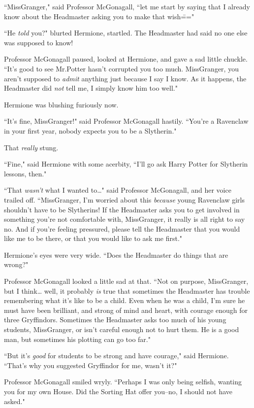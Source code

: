 ``Miss\?Granger," said Professor McGonagall, ``let me start by saying that I already know about the Headmaster asking you to make that wish\==="

``He \emph{told} you?" blurted Hermione, startled. The Headmaster had said no one else was supposed to know!

Professor McGonagall paused, looked at Hermione, and gave a sad little chuckle. ``It's good to see Mr.\?Potter hasn't corrupted you too much. Miss\?Granger, you aren't supposed to \emph{admit} anything just because I say I know. As it happens, the Headmaster did \emph{not} tell me, I simply know him too well."

Hermione was blushing furiously now.

``It's fine, Miss\?Granger!" said Professor McGonagall hastily. ``You're a Ravenclaw in your first year, nobody expects you to be a Slytherin."

That \emph{really} stung.

``Fine," said Hermione with some acerbity, ``I'll go ask Harry Potter for Slytherin lessons, then."

``That \emph{wasn't} what I wanted to{\ldots}" said Professor McGonagall, and her voice trailed off. ``Miss\?Granger, I'm worried about this \emph{because} young Ravenclaw girls shouldn't have to be Slytherins! If the Headmaster asks you to get involved in something you're not comfortable with, Miss\?Granger, it really is all right to say no. And if you're feeling pressured, please tell the Headmaster that you would like me to be there, or that you would like to ask me first."

Hermione's eyes were very wide. ``Does the Headmaster do things that are wrong?"

Professor McGonagall looked a little sad at that. ``Not on purpose, Miss\?Granger, but I think{\ldots} well, it probably \emph{is} true that sometimes the Headmaster has trouble remembering what it's like to be a child. Even when he was a child, I'm sure he must have been brilliant, and strong of mind and heart, with courage enough for three Gryffindors. Sometimes the Headmaster asks too much of his young students, Miss\?Granger, or isn't careful enough not to hurt them. He is a good man, but sometimes his plotting can go too far."

``But it's \emph{good} for students to be strong and have courage," said Hermione. ``That's why you suggested Gryffindor for me, wasn't it?"

Professor McGonagall smiled wryly. ``Perhaps I was only being selfish, wanting you for my own House. Did the Sorting Hat offer you\---no, I should not have asked."

